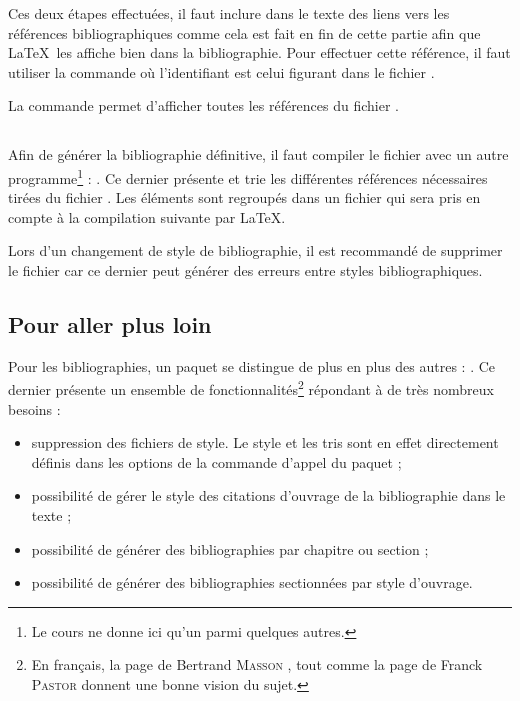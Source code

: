 Ces deux étapes effectuées, il faut inclure dans le texte des liens vers les références bibliographiques comme cela est fait en fin de cette partie afin que \LaTeX\ les affiche bien dans la bibliographie. Pour effectuer cette référence, il faut utiliser la commande  où l'identifiant est celui figurant dans le fichier .

La commande  permet d'afficher toutes les références du fichier .


\subsection{\BibTeX}

Afin de générer la bibliographie définitive, il faut compiler le fichier  avec un autre programme\footnote{Le cours ne donne ici qu'un parmi quelques autres.} : \BibTeX. Ce dernier présente et trie les différentes références nécessaires tirées du fichier . Les éléments sont regroupés dans un fichier  qui sera pris en compte à la compilation suivante par \LaTeX.

Lors d'un changement de style de bibliographie, il est recommandé de supprimer le fichier  car ce dernier peut générer des erreurs entre styles bibliographiques.

\subsection{Pour aller plus loin}

Pour les bibliographies, un paquet se distingue de plus en plus des autres : . Ce dernier présente un ensemble de fonctionnalités\footnote{En français, la page de Bertrand \textsc{Masson} \cite{mass} , tout comme la page de Franck \textsc{Pastor} \cite{past}  donnent une bonne vision du sujet.} répondant à de très nombreux besoins :
\begin{itemize}
\item suppression des fichiers de style. Le style et les tris sont en effet directement définis dans les options de la commande d'appel du paquet ;
\item possibilité de gérer le style des citations d'ouvrage de la bibliographie dans le texte ;
\item possibilité de générer des bibliographies par chapitre ou section ;
\item possibilité de générer des bibliographies sectionnées par style d'ouvrage.
\end{itemize}


